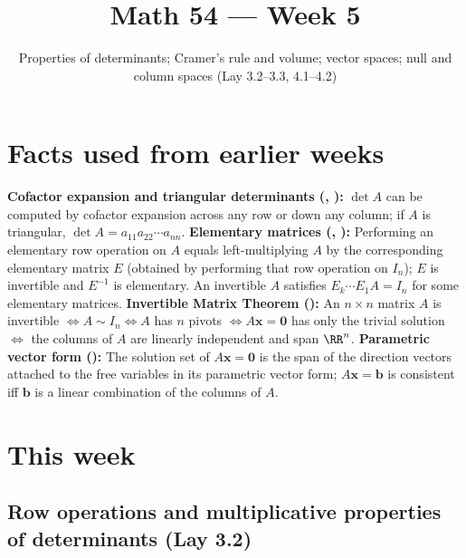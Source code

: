 \documentclass[10pt]{scrartcl}
\title{Math 54 --- Week 5}
\subtitle{Properties of determinants; Cramer's rule and volume; vector spaces; null and column spaces (Lay 3.2--3.3, 4.1--4.2)}
\author{}\date{}\ihead{}
\newcommand{\vv}[1]{\mathbf{#1}}
\begin{document}
\maketitle

\section{Facts used from earlier weeks}
\begin{enumerate}[label=(W\arabic*),leftmargin=2.8em,itemsep=4pt]
  \ii {}\textbf{Cofactor expansion and triangular determinants (, ):} $\det A$ can be computed by cofactor expansion across any row or down any column; if $A$ is triangular, $\det A=a_{11}a_{22}\cdots a_{nn}$.
  \ii {}\textbf{Elementary matrices (, ):} Performing an elementary row operation on $A$ equals left-multiplying $A$ by the corresponding elementary matrix $E$ (obtained by performing that row operation on $I_n$); $E$ is invertible and $E^{-1}$ is elementary. An invertible $A$ satisfies $E_k\cdots E_1A=I_n$ for some elementary matrices.
  \ii {}\textbf{Invertible Matrix Theorem ():} An $n\times n$ matrix $A$ is invertible $\iff A\sim I_n \iff A$ has $n$ pivots $\iff A\vv x=\vv 0$ has only the trivial solution $\iff$ the columns of $A$ are linearly independent and span $\RR^n$.
  \ii {}\textbf{Parametric vector form ():} The solution set of $A\vv x=\vv 0$ is the span of the direction vectors attached to the free variables in its parametric vector form; $A\vv x=\vv b$ is consistent iff $\vv b$ is a linear combination of the columns of $A$.
\end{enumerate}

\section{This week}

\subsection{Row operations and multiplicative properties of determinants (Lay 3.2)}
\end{document}
